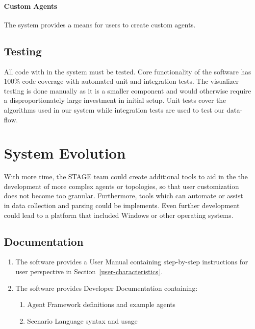\documentclass[titlepage]{article}
\begin{document}
    \paragraph{Custom Agents} The system provides a means for users to create custom agents.

\subsection{Testing%
    \label{testing}%
}
All code with in the system must be tested. Core functionality of the software has 100\% code coverage with automated unit and integration tests.  The visualizer testing is done manually as it is a smaller component and would otherwise require a disproportionately large investment in initial setup.  Unit tests cover the algorithms used in our system while integration tests are used to test our data-flow.  

\section{System Evolution}

With more time, the STAGE team could create additional tools to aid in the the development of more complex agents or topologies, so that user customization does not become too granular.  Furthermore, tools which can automate or assist in data collection and parsing could be implements.  Even further development could lead to a platform that included Windows or other operating systems.


\subsection{Documentation%
  \label{documentation}%
}
\begin{enumerate}
    \item The software provides a User Manual containing step-by-step instructions for user perspective in Section~\ref{user-characteristics}.
    \item The software provides Developer Documentation containing:
    \begin{enumerate}
        \item Agent Framework definitions and example agents
        \item Scenario Language syntax and usage
    \end{enumerate}
\end{enumerate}


\appendix
\pagebreak
\end{document}

